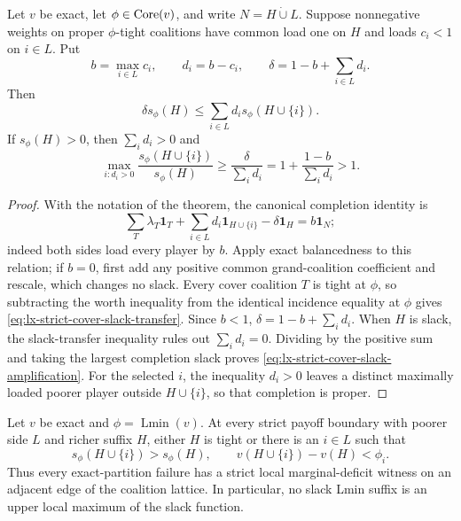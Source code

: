 \begin{theorem}
\label{thm:lx-strict-cover-slack-transfer}
Let $v$ be exact, let $\phi\in\operatorname{Core}(v)$, and write
$N=H\mathbin{\dot\cup}L$. Suppose nonnegative weights on proper
$\phi$-tight coalitions have common load one on $H$ and loads
$c_i<1$ on $i\in L$. Put
\[
 b=\max_{i\in L}c_i,\qquad d_i=b-c_i,
 \qquad \delta=1-b+\sum_{i\in L}d_i.
\]
Then
\[
 \delta s_\phi(H)
 \leq\sum_{i\in L}d_i s_\phi(H\cup\{i\}).          \tag{ST}
 \label{eq:lx-strict-cover-slack-transfer}
\]
If $s_\phi(H)>0$, then $\sum_i d_i>0$ and
\[
 \max_{i:d_i>0}\frac{s_\phi(H\cup\{i\})}{s_\phi(H)}
 \geq\frac{\delta}{\sum_i d_i}
 =1+\frac{1-b}{\sum_i d_i}>1.                       \tag{SA}
 \label{eq:lx-strict-cover-slack-amplification}
\]
\end{theorem}

\begin{proof}
With the notation of the theorem, the canonical completion identity is
\[
 \sum_T\lambda_T\mathbf1_T
 +\sum_{i\in L}d_i\mathbf1_{H\cup\{i\}}
 -\delta\mathbf1_H=b\mathbf1_N;
\]
indeed both sides load every player by $b$. Apply exact balancedness to
this relation; if $b=0$, first add any positive common grand-coalition
coefficient and rescale, which changes no slack. Every cover coalition $T$
is tight at $\phi$, so subtracting
the worth inequality from the identical incidence equality at $\phi$ gives
\eqref{eq:lx-strict-cover-slack-transfer}. Since $b<1$,
$\delta=1-b+\sum_i d_i$. When $H$ is slack, the slack-transfer inequality
rules out $\sum_i d_i=0$. Dividing by the positive sum and taking the
largest completion slack proves \eqref{eq:lx-strict-cover-slack-amplification}.
For the selected $i$, the inequality $d_i>0$ leaves a distinct maximally
loaded poorer player outside $H\cup\{i\}$, so that completion is proper.
\end{proof}

\begin{corollary}
\label{cor:lx-universal-lmin-slack-ascent}
Let $v$ be exact and $\phi=\operatorname{Lmin}(v)$. At every strict payoff
boundary with poorer side $L$ and richer suffix $H$, either $H$ is tight or
there is an $i\in L$ such that
\[
 s_\phi(H\cup\{i\})>s_\phi(H),
 \qquad
 v(H\cup\{i\})-v(H)<\phi_i.                         \tag{UA}
 \label{eq:lx-universal-lmin-slack-ascent}
\]
Thus every exact-partition failure has a strict local marginal-deficit
witness on an adjacent edge of the coalition lattice. In particular, no
slack Lmin suffix is an upper local maximum of the slack function.
\end{corollary}

